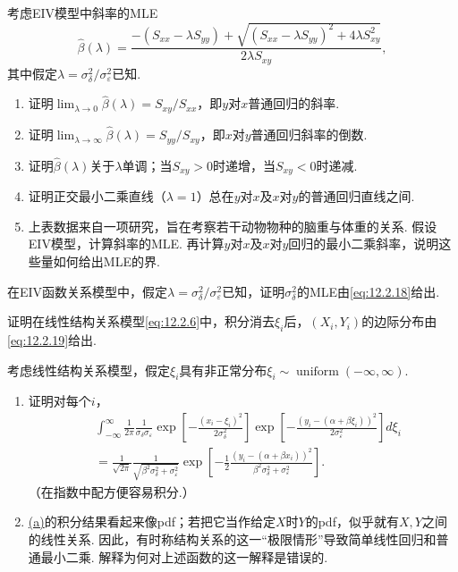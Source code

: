 \begin{exercise}\label{exercise:12.4}
考虑EIV模型中斜率的MLE
$$\hat\beta(\lambda)=\frac{-(S_{xx}-\lambda S_{yy})+\sqrt{(S_{xx}-\lambda S_{yy})^2+4\lambda S_{xy}^2}}{2\lambda S_{xy}},$$
其中假定$\lambda=\sigma_\delta^2/\sigma_\varepsilon^2$已知.
\begin{enumerate}[label=(\alph*)]
\item\label{item:12.4.a} 证明$\lim_{\lambda\to0}\hat\beta(\lambda)=S_{xy}/S_{xx}$，即$y$对$x$普通回归的斜率.
\item\label{item:12.4.b} 证明$\lim_{\lambda\to\infty}\hat\beta(\lambda)=S_{yy}/S_{xy}$，即$x$对$y$普通回归斜率的倒数.
\item\label{item:12.4.c} 证明$\hat\beta(\lambda)$关于$\lambda$单调；当$S_{xy}>0$时递增，当$S_{xy}<0$时递减.
\item\label{item:12.4.d} 证明正交最小二乘直线（$\lambda=1$）总在$y$对$x$及$x$对$y$的普通回归直线之间.
\item\label{item:12.4.e} 上表数据来自一项研究，旨在考察若干动物物种的脑重与体重的关系. 假设EIV模型，计算斜率的MLE. 再计算$y$对$x$及$x$对$y$回归的最小二乘斜率，说明这些量如何给出MLE的界.
\end{enumerate}
\end{exercise}

\begin{exercise}\label{exercise:12.5}
在EIV函数关系模型中，假定$\lambda=\sigma_\delta^2/\sigma_\varepsilon^2$已知，证明$\sigma_\delta^2$的MLE由\eqref{eq:12.2.18}给出.
\end{exercise}

\begin{exercise}\label{exercise:12.6}
证明在线性结构关系模型\eqref{eq:12.2.6}中，积分消去$\xi_i$后，$(X_i,Y_i)$的边际分布由\eqref{eq:12.2.19}给出.
\end{exercise}

\begin{exercise}\label{exercise:12.7}
考虑线性结构关系模型，假定$\xi_i$具有非正常分布$\xi_i\sim\operatorname{uniform}(-\infty,\infty)$.
\begin{enumerate}[label=(\alph*)]
\item\label{item:12.7.a} 证明对每个$i$，
$$\begin{aligned}
&\int_{-\infty}^\infty\frac1{2\pi}\frac1{\sigma_\delta\sigma_\varepsilon}
\exp\left[-\frac{(x_i-\xi_i)^2}{2\sigma_\delta^2}\right]
\exp\left[-\frac{(y_i-(\alpha+\beta\xi_i))^2}{2\sigma_\varepsilon^2}\right]d\xi_i\\
&=\frac1{\sqrt{2\pi}}\frac1{\sqrt{\beta^2\sigma_\delta^2+\sigma_\varepsilon^2}}
\exp\left[-\frac12\frac{(y_i-(\alpha+\beta x_i))^2}{\beta^2\sigma_\delta^2+\sigma_\varepsilon^2}\right].
\end{aligned}$$
（在指数中配方便容易积分.）
\item\label{item:12.7.b} \hyperref[item:12.7.a]{(a)}的积分结果看起来像pdf；若把它当作给定$X$时$Y$的pdf，似乎就有$X,Y$之间的线性关系. 因此，有时称结构关系的这一“极限情形”导致简单线性回归和普通最小二乘. 解释为何对上述函数的这一解释是错误的.
\end{enumerate}
\end{exercise}

